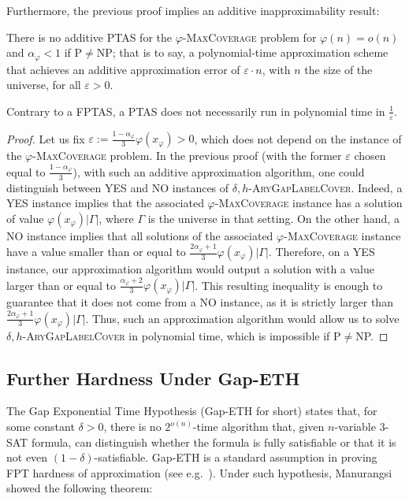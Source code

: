 Furthermore, the previous proof implies an additive inapproximability result:

\begin{corollary}
  There is no additive PTAS for the $\varphi$-\textsc{MaxCoverage} problem for $\varphi(n) = o(n)$ and $\alpha_{\varphi}<1$ if \textrm{P}$\not=$\textrm{NP}; that is to say, a polynomial-time approximation scheme that achieves an additive approximation error of $\varepsilon \cdot n$, with $n$ the size of the universe, for all $\varepsilon > 0$.
  \label{cor:Hardness}
\end{corollary}

\begin{rk}
Contrary to a FPTAS, a PTAS does not necessarily run in polynomial time in $\frac{1}{\varepsilon}$.
\end{rk}

\begin{proof}
  Let us fix $\varepsilon := \frac{1-\alpha_{\varphi}}{3}\varphi(x_{\varphi}) > 0$, which does not depend on the instance of the $\varphi$-\textsc{MaxCoverage} problem. In the previous proof (with the former $\varepsilon$ chosen equal to $\frac{1-\alpha_{\varphi}}{3}$), with such an additive approximation algorithm, one could distinguish between YES and NO instances of $\delta,h$-\textsc{AryGapLabelCover}. Indeed, a YES instance implies that the associated $\varphi$-\textsc{MaxCoverage} instance has a solution of value $\varphi(x_{\varphi}) |\Gamma|$, where $\Gamma$ is the universe in that setting. On the other hand, a NO instance implies that all solutions of the associated $\varphi$-\textsc{MaxCoverage} instance have a value smaller than or equal to $\frac{2\alpha_\varphi+1}{3}\varphi(x_{\varphi}) |\Gamma|$. Therefore, on a YES instance, our approximation algorithm would output a solution with a value larger than or equal to $\frac{\alpha_{\varphi}+2}{3}\varphi(x_{\varphi}) |\Gamma|$. This resulting inequality is enough to guarantee that it does not come from a NO instance, as it is strictly larger than $\frac{2\alpha_\varphi+1}{3}\varphi(x_{\varphi}) |\Gamma|$. Thus, such an approximation algorithm would allow us to solve $\delta,h$-\textsc{AryGapLabelCover} in polynomial time, which is impossible if \textrm{P}$\not=$\textrm{NP}.
\end{proof}

\subsection{Further Hardness Under Gap-ETH}
  \label{section:GapETH}
  The Gap Exponential Time Hypothesis (Gap-ETH for short) states that, for some constant $\delta > 0$, there is no $2^{o(n)}$-time algorithm that, given $n$-variable $3$-SAT formula, can distinguish whether the formula is fully satisfiable or that it is not even $(1-\delta)$-satisfiable. Gap-ETH is a standard assumption in proving FPT hardness of approximation (see e.g.~\cite{CCKLMNT17}). Under such hypothesis, Manurangsi showed the following theorem:

